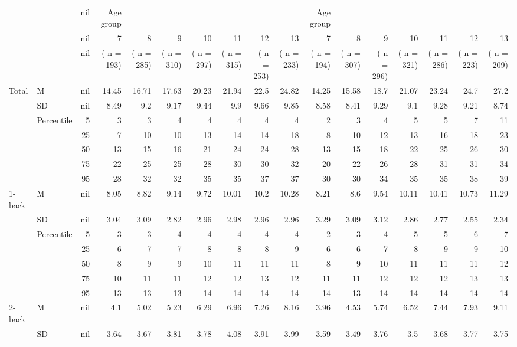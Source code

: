 \documentclass{article}
\begin{document}
\begin{center}
\begin{tabular}{llrrrrrrrrrrrrrrr}
 &  & nil & Age group &  &  &  &  &  &  & Age group &  &  &  &  &  & \\
 &  & nil & 7 & 8 & 9 & 10 & 11 & 12 & 13 & 7 & 8 & 9 & 10 & 11 & 12 & 13\\
 &  & nil & ( n = 193) & ( n = 285) & ( n = 310) & ( n = 297) & ( n = 315) & ( n = 253) & ( n = 233) & ( n = 194) & ( n = 307) & ( n = 296) & ( n = 321) & ( n = 286) & ( n = 223) & ( n = 209)\\
Total & M & nil & 14.45 & 16.71 & 17.63 & 20.23 & 21.94 & 22.5 & 24.82 & 14.25 & 15.58 & 18.7 & 21.07 & 23.24 & 24.7 & 27.2\\
 & SD & nil & 8.49 & 9.2 & 9.17 & 9.44 & 9.9 & 9.66 & 9.85 & 8.58 & 8.41 & 9.29 & 9.1 & 9.28 & 9.21 & 8.74\\
 & Percentile & 5 & 3 & 3 & 4 & 4 & 4 & 4 & 4 & 2 & 3 & 4 & 5 & 5 & 7 & 11\\
 &  & 25 & 7 & 10 & 10 & 13 & 14 & 14 & 18 & 8 & 10 & 12 & 13 & 16 & 18 & 23\\
 &  & 50 & 13 & 15 & 16 & 21 & 24 & 24 & 28 & 13 & 15 & 18 & 22 & 25 & 26 & 30\\
 &  & 75 & 22 & 25 & 25 & 28 & 30 & 30 & 32 & 20 & 22 & 26 & 28 & 31 & 31 & 34\\
 &  & 95 & 28 & 32 & 32 & 35 & 35 & 37 & 37 & 30 & 30 & 34 & 35 & 35 & 38 & 39\\
1-back & M & nil & 8.05 & 8.82 & 9.14 & 9.72 & 10.01 & 10.2 & 10.28 & 8.21 & 8.6 & 9.54 & 10.11 & 10.41 & 10.73 & 11.29\\
 & SD & nil & 3.04 & 3.09 & 2.82 & 2.96 & 2.98 & 2.96 & 2.96 & 3.29 & 3.09 & 3.12 & 2.86 & 2.77 & 2.55 & 2.34\\
 & Percentile & 5 & 3 & 3 & 4 & 4 & 4 & 4 & 4 & 2 & 3 & 4 & 5 & 5 & 6 & 7\\
 &  & 25 & 6 & 7 & 7 & 8 & 8 & 8 & 9 & 6 & 6 & 7 & 8 & 9 & 9 & 10\\
 &  & 50 & 8 & 9 & 9 & 10 & 11 & 11 & 11 & 8 & 9 & 10 & 11 & 11 & 11 & 12\\
 &  & 75 & 10 & 11 & 11 & 12 & 12 & 13 & 12 & 11 & 11 & 12 & 12 & 12 & 13 & 13\\
 &  & 95 & 13 & 13 & 13 & 14 & 14 & 14 & 14 & 14 & 13 & 14 & 14 & 14 & 14 & 14\\
2-back & M & nil & 4.1 & 5.02 & 5.23 & 6.29 & 6.96 & 7.26 & 8.16 & 3.96 & 4.53 & 5.74 & 6.52 & 7.44 & 7.93 & 9.11\\
 & SD & nil & 3.64 & 3.67 & 3.81 & 3.78 & 4.08 & 3.91 & 3.99 & 3.59 & 3.49 & 3.76 & 3.5 & 3.68 & 3.77 & 3.75\\

\end{tabular}
\end{center}
\end{document}
